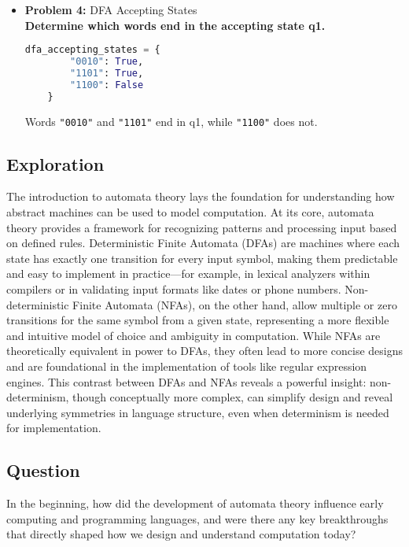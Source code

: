 \documentclass[11pt]{article}
\begin{document}
\begin{itemize}[leftmargin=*]
    \item \textbf{Problem 4:} DFA Accepting States
    \\ \textbf{Determine which words end in the accepting state q1.}

    \begin{lstlisting}[language=Python]
        dfa_accepting_states = {
        "0010": True,
        "1101": True,
        "1100": False
    }
        \end{lstlisting}

Words \texttt{"0010"} and \texttt{"1101"} end in q1, while \texttt{"1100"} does not.
    

\end{itemize}

\subsection{Exploration}
The introduction to automata theory lays the foundation for understanding how abstract machines can be used to model computation. At its core, automata theory provides a framework for recognizing patterns and processing input based on defined rules. Deterministic Finite Automata (DFAs) are machines where each state has exactly one transition for every input symbol, making them predictable and easy to implement in practice—for example, in lexical analyzers within compilers or in validating input formats like dates or phone numbers. Non-deterministic Finite Automata (NFAs), on the other hand, allow multiple or zero transitions for the same symbol from a given state, representing a more flexible and intuitive model of choice and ambiguity in computation. While NFAs are theoretically equivalent in power to DFAs, they often lead to more concise designs and are foundational in the implementation of tools like regular expression engines. This contrast between DFAs and NFAs reveals a powerful insight: non-determinism, though conceptually more complex, can simplify design and reveal underlying symmetries in language structure, even when determinism is needed for implementation.

\subsection{Question}
In the beginning, how did the development of automata theory influence early computing and programming languages, and were there any key breakthroughs that directly shaped how we design and understand computation today?
\end{document}
